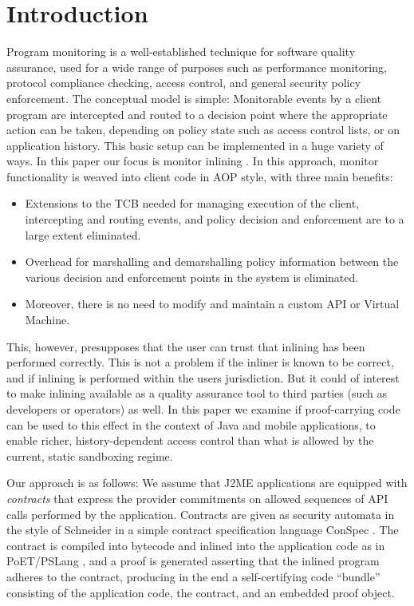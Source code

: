 \documentclass[10pt,twocolumn]{article}
\begin{document}
\section{Introduction}
Program monitoring \cite{Lig06,javamac,javamop} is a well-established technique for software quality assurance, used for a wide range of purposes such as performance monitoring, protocol compliance checking, access control, and general security policy enforcement. The conceptual model is simple: Monitorable events by a client program are intercepted and routed to a decision point where the appropriate action can be taken, depending on policy state such as access control lists, or on application history. This basic setup can be implemented in a huge variety of ways. In this paper our focus is monitor inlining \cite{ErlSch00}. In this approach, monitor functionality is weaved into client code in AOP style, with three main benefits:
\begin{itemize}
\item Extensions to the TCB needed for managing execution of the client, intercepting and routing events, and policy decision and enforcement are to a large extent eliminated.
\item Overhead for marshalling and demarshalling policy information between the various decision and enforcement points in the system is eliminated.
\item Moreover, there is no need to modify and maintain a custom API or Virtual Machine.
\end{itemize}
This, however, presupposes that the user can trust that inlining has been
performed correctly. This is not a problem if the inliner is known to be
correct, and if inlining is performed within the users jurisdiction.
But it could of interest to make inlining available as a quality assurance
tool to third parties (such as developers or operators) as well. In this
paper we examine if proof-carrying code can be used to this effect in the
context of Java and mobile applications, to enable richer, history-dependent
access control than what is allowed by the current, static sandboxing regime.

Our approach is as follows: We assume that J2ME applications
are equipped with {\em contracts} that express the provider commitments on
allowed sequences of API calls performed by the application. Contracts are given as security automata in 
the style of Schneider \cite{Sch00} in a simple contract specification 
language ConSpec \cite{AktNal07}.  The contract is compiled into bytecode and inlined
into the application code as in PoET/PSLang \cite{ErlSchb00}, and a proof
is generated asserting that the inlined program adheres to the contract,
producing in the end a self-certifying code ``bundle'' consisting of the 
application code, the contract, and an embedded proof object.
\end{document}
